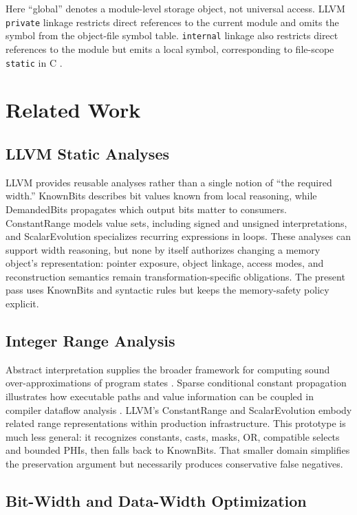\documentclass[11pt,twocolumn]{article}
\begin{document}
Here ``global'' denotes a module-level storage object, not universal access.
LLVM \texttt{private} linkage restricts direct references to the current module
and omits the symbol from the object-file symbol table. \texttt{internal}
linkage also restricts direct references to the module but emits a local symbol,
corresponding to file-scope \texttt{static} in C \citep{llvmLangRef}.

\section{Related Work}

\subsection{LLVM Static Analyses}

LLVM provides reusable analyses rather than a single notion of ``the required
width.'' KnownBits describes bit values known from local reasoning, while
DemandedBits propagates which output bits matter to consumers. ConstantRange
models value sets, including signed and unsigned interpretations, and
ScalarEvolution specializes recurring expressions in loops. These analyses can
support width reasoning, but none by itself authorizes changing a memory
object's representation: pointer exposure, object linkage, access modes, and
reconstruction semantics remain transformation-specific obligations. The
present pass uses KnownBits and syntactic rules but keeps the memory-safety
policy explicit.

\subsection{Integer Range Analysis}

Abstract interpretation supplies the broader framework for computing sound
over-approximations of program states \citep{cousot1977abstract}. Sparse
conditional constant propagation illustrates how executable paths and value
information can be coupled in compiler dataflow analysis
\citep{wegman1991sccp}. LLVM's ConstantRange and ScalarEvolution embody related
range representations within production infrastructure. This prototype is much
less general: it recognizes constants, casts, masks, OR, compatible selects and
bounded PHIs, then falls back to KnownBits. That smaller domain simplifies the
preservation argument but necessarily produces conservative false negatives.

\subsection{Bit-Width and Data-Width Optimization}
\end{document}
